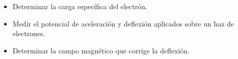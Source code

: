 \begin{itemize}
    \item Determinar la carga específica del electrón.
    \item Medir el potencial de aceleración y deflexión aplicados sobre un haz de electrones.
    \item Determinar la campo magnético que corrige la deflexión.
\end{itemize}
